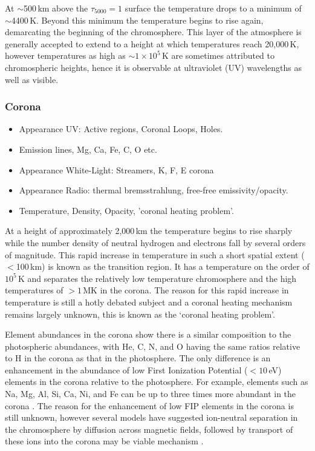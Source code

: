 At $\sim$500\,km above the $\tau_{5000}=1$ surface the temperature drops to a minimum of $\sim$4400\,K. Beyond this minimum the temperature begins to rise again, demarcating the beginning of the chromosphere. This layer of the atmosphere is generally accepted to extend to a height at which temperatures reach 20,000\,K, however temperatures as high as $\sim1\times10^5$\,K are sometimes attributed to chromospheric heights, hence it is observable at ultraviolet (UV) wavelengths as well as visible. 

\subsubsection{Corona}\label{sec:123}

\begin{itemize}
\item Appearance UV: Active regions, Coronal Loops, Holes.
\item Emission lines, Mg, Ca, Fe, C, O etc.
\item Appearance White-Light: Streamers, K, F, E corona
\item Appearance Radio: thermal bremsstrahlung, free-free emissivity/opacity.
\item Temperature, Density, Opacity, 'coronal heating problem'.
\end{itemize}


At a height of approximately 2,000\,km the temperature begins to rise sharply while the number density of neutral hydrogen and electrons fall by several orders of magnitude. This rapid increase in temperature in such a short spatial extent ($<$100\,km) is known as the transition region. It has a temperature on the order of $10^5$\,K and separates the relatively low temperature chromosphere and the high temperatures of $>1$\,MK in the corona. The reason for this rapid increase in temperature is still a hotly debated subject and a coronal heating mechanism remains largely unknown, this is known as the  \textquoteleft coronal heating problem'.


Element abundances in the corona show there is a similar composition to the photospheric abundances, with He, C, N, and O having the same ratios relative to H in the corona as that in the photosphere. The only difference is an enhancement in the abundance of low First Ionization Potential ($<10$\,eV) elements in the corona relative to the photosphere. For example, elements such as Na, Mg, Al, Si, Ca, Ni, and Fe can be up to three times more abundant in the corona \citep{feldman2003}. The reason for the enhancement of low FIP elements in the corona is still unknown, however several models have suggested ion-neutral separation in the chromosphere by diffusion across magnetic fields, followed by transport of these ions into the corona may be viable mechanism \citep{geiss1985}. 


